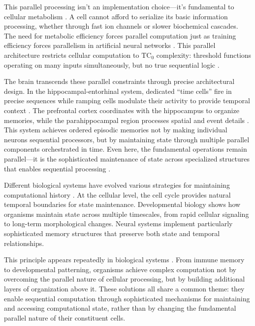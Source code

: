 \documentclass[12pt]{article}
\begin{document}
This parallel processing isn't an implementation choice---it's fundamental to cellular metabolism \cite{cai2024efficient,hoel2020emergence}.
A cell cannot afford to serialize its basic information processing, whether through fast ion channels or slower biochemical cascades.
The need for metabolic efficiency forces parallel computation just as training efficiency forces parallelism in artificial neural networks \cite{barrett2019analyzing}.
This parallel architecture restricts cellular computation to $\text{TC}_0$ complexity: threshold functions operating on many inputs simultaneously, but no true sequential logic \cite{wang2023parallel}.

The brain transcends these parallel constraints through precise architectural design.
In the hippocampal-entorhinal system, dedicated ``time cells'' fire in precise sequences while ramping cells modulate their activity to provide temporal context \cite{quentin2019differential}.
The prefrontal cortex coordinates with the hippocampus to organize memories, while the parahippocampal region processes spatial and event details \cite{martini2015information}.
This system achieves ordered episodic memories not by making individual neurons sequential processors, but by maintaining state through multiple parallel components orchestrated in time.
Even here, the fundamental operations remain parallel---it is the sophisticated maintenance of state across specialized structures that enables sequential processing \cite{bruno2022epigenetic}.

Different biological systems have evolved various strategies for maintaining computational history \cite{espinosa2024molecular}.
At the cellular level, the cell cycle provides natural temporal boundaries for state maintenance.
Developmental biology shows how organisms maintain state across multiple timescales, from rapid cellular signaling to long-term morphological changes.
Neural systems implement particularly sophisticated memory structures that preserve both state and temporal relationships.

This principle appears repeatedly in biological systems \cite{fu2024memory}.
From immune memory to developmental patterning, organisms achieve complex computation not by overcoming the parallel nature of cellular processing, but by building additional layers of organization above it.
These solutions all share a common theme: they enable sequential computation through sophisticated mechanisms for maintaining and accessing computational state, rather than by changing the fundamental parallel nature of their constituent cells.
\end{document}
